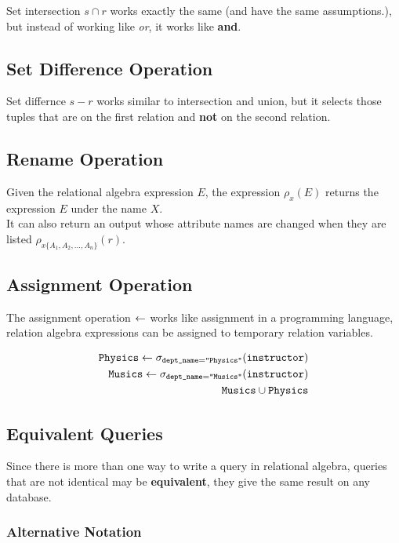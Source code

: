 \documentclass[11pt,a4paper,twocolumn]{book}
\begin{document}
Set intersection $s \cap r$ works exactly the same (and have the same assumptions.), but instead of working like \textit{or}, it works like \textbf{and}.

\subsection{Set Difference Operation} 

Set differnce $s - r$ works similar to intersection and union, but it selects those tuples that are on the first relation and \textbf{not} on the second relation.

\subsection{Rename Operation}

Given the relational algebra expression $E$, the expression $\rho_x(E)$ returns the expression $E$ under the name $X$.\\

It can also return an output whose attribute names are changed when they are listed $\rho_{x\{A_1, A_2, \dots, A_n\}}(r)$.

\subsection{Assignment Operation}

The assignment operation $\leftarrow$ works like assignment in a programming language, relation algebra expressions can be assigned to temporary relation variables.

\begin{align*}
\texttt{Physics} \leftarrow \sigma_{\texttt{dept\_name} = \texttt{"Physics"}}(\texttt{instructor})\\
\texttt{Musics} \leftarrow \sigma_{\texttt{dept\_name} = \texttt{"Musics"}}(\texttt{instructor})\\
\texttt{Musics} \cup \texttt{Physics}
\end{align*}

\subsection{Equivalent Queries}

Since there is more than one way to write a query in relational algebra, queries that are not identical may be \textbf{equivalent}, they give the same result on any database.

\subsubsection{Alternative Notation}
\end{document}
